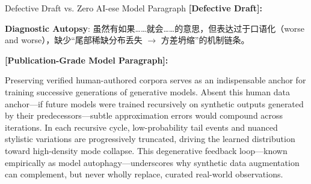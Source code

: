 \begin{ExampleBox}{Defective Draft vs. Zero AI-ese Model Paragraph}
\textbf{\color{TargetHighlight}[Defective Draft]:}\par
{}\par\vspace{4pt}
\textbf{Diagnostic Autopsy}: 虽然有如果……就会……的意思，但表达过于口语化（worse and worse），缺少“尾部稀缺分布丢失 $\to$ 方差坍缩”的机制链条。\par\vspace{6pt}
\textbf{\color{AcadNavy}[Publication-Grade Model Paragraph]:}\par
Preserving verified human-authored corpora serves as an indispensable anchor for training successive generations of generative models. Absent this human data anchor---if future models were trained recursively on synthetic outputs generated by their predecessors---subtle approximation errors would compound across iterations. In each recursive cycle, low-probability tail events and nuanced stylistic variations are progressively truncated, driving the learned distribution toward high-density mode collapse. This degenerative feedback loop---known empirically as model autophagy---underscores why synthetic data augmentation can complement, but never wholly replace, curated real-world observations.
\end{ExampleBox}
